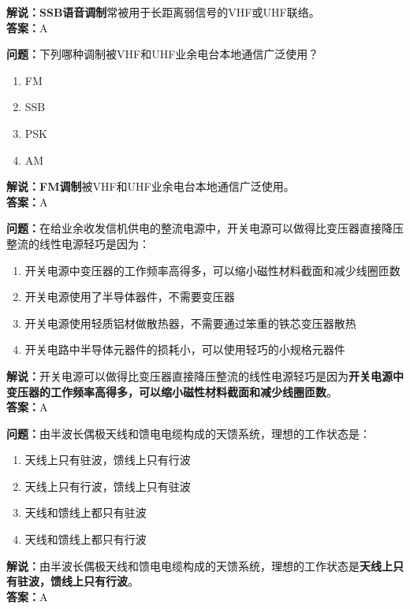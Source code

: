 \textbf{解说：}\textbf{SSB语音调制}常被用于长距离弱信号的VHF或UHF联络。\\\textbf{答案：}A%



\textbf{问题：}下列哪种调制被VHF和UHF业余电台本地通信广泛使用？

\begin{enumerate}[label=\Alph*), leftmargin=1cm]
	\item FM
	\item SSB
	\item PSK
	\item AM
\end{enumerate}

\textbf{解说：}\textbf{FM调制}被VHF和UHF业余电台本地通信广泛使用。\\\textbf{答案：}A%



\textbf{问题：}在给业余收发信机供电的整流电源中，开关电源可以做得比变压器直接降压整流的线性电源轻巧是因为：

\begin{enumerate}[label=\Alph*), leftmargin=1cm]
	\item 开关电源中变压器的工作频率高得多，可以缩小磁性材料截面和减少线圈匝数
	\item 开关电源使用了半导体器件，不需要变压器
	\item 开关电源使用轻质铝材做散热器，不需要通过笨重的铁芯变压器散热
	\item 开关电路中半导体元器件的损耗小，可以使用轻巧的小规格元器件
\end{enumerate}

\textbf{解说：}开关电源可以做得比变压器直接降压整流的线性电源轻巧是因为\textbf{开关电源中变压器的工作频率高得多，可以缩小磁性材料截面和减少线圈匝数}。\\\textbf{答案：}A%



\textbf{问题：}由半波长偶极天线和馈电电缆构成的天馈系统，理想的工作状态是：

\begin{enumerate}[label=\Alph*), leftmargin=1cm]
	\item 天线上只有驻波，馈线上只有行波
	\item 天线上只有行波，馈线上只有驻波
	\item 天线和馈线上都只有驻波
	\item 天线和馈线上都只有行波
\end{enumerate}

\textbf{解说：}由半波长偶极天线和馈电电缆构成的天馈系统，理想的工作状态是\textbf{天线上只有驻波，馈线上只有行波}。\\\textbf{答案：}A%



